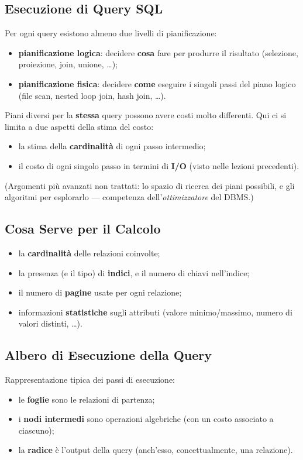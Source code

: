 \documentclass[12pt, a4paper]{article}
\begin{document}
\subsection{Esecuzione di Query SQL}
Per ogni query esistono almeno due livelli di pianificazione:
\begin{itemize}
    \item \textbf{pianificazione logica}: decidere \textbf{cosa} fare per produrre il risultato (selezione, proiezione, join, unione, \ldots);
    \item \textbf{pianificazione fisica}: decidere \textbf{come} eseguire i singoli passi del piano logico (file scan, nested loop join, hash join, \ldots).
\end{itemize}
Piani diversi per la \textbf{stessa} query possono avere costi molto differenti. Qui ci si limita a due aspetti della stima del costo:
\begin{itemize}
    \item la stima della \textbf{cardinalità} di ogni passo intermedio;
    \item il costo di ogni singolo passo in termini di \textbf{I/O} (visto nelle lezioni precedenti).
\end{itemize}
(Argomenti più avanzati non trattati: lo spazio di ricerca dei piani possibili, e gli algoritmi per esplorarlo — competenza dell'\textit{ottimizzatore} del DBMS.)

\subsection{Cosa Serve per il Calcolo}
\begin{itemize}
    \item la \textbf{cardinalità} delle relazioni coinvolte;
    \item la presenza (e il tipo) di \textbf{indici}, e il numero di chiavi nell'indice;
    \item il numero di \textbf{pagine} usate per ogni relazione;
    \item informazioni \textbf{statistiche} sugli attributi (valore minimo/massimo, numero di valori distinti, \ldots).
\end{itemize}

\subsection{Albero di Esecuzione della Query}
Rappresentazione tipica dei passi di esecuzione:
\begin{itemize}
    \item le \textbf{foglie} sono le relazioni di partenza;
    \item i \textbf{nodi intermedi} sono operazioni algebriche (con un costo associato a ciascuno);
    \item la \textbf{radice} è l'output della query (anch'esso, concettualmente, una relazione).
\end{itemize}
\end{document}
